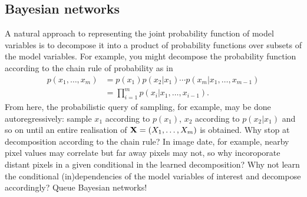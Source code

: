 \documentclass[11pt]{article}
\begin{document}
\subsection{Bayesian networks}
A natural approach to representing the joint probability function of model variables is to decompose it into a product of probability functions over subsets of the model variables. For example, you might decompose the probability function according to the chain rule of probability as in
\begin{align*}
    p(x_1,\dots,x_m)
    &=
    p(x_1)p(x_2|x_1)\cdots p(x_m|x_1,\dots,x_{m-1})\\
    &=
    \prod_{i=1}^m p(x_i|x_1,\dots,x_{i-1}).
\end{align*}
From here, the probabilistic query of sampling, for example, may be done autoregressively: sample $x_1$ according to $p(x_1)$, $x_2$ according to $p(x_2|x_1)$ and so on until an entire realisation of $\mathbf{X}=(X_1,\dots,X_m)$ is obtained. Why stop at decomposition according to the chain rule? In image date, for example, nearby pixel values may correlate but far away pixels may not, so why incoroporate distant pixels in a given conditional in the learned decomposition? Why not learn the conditional (in)dependencies of the model variables of interest and decompose accordingly? Queue Bayesian networks!
\end{document}

